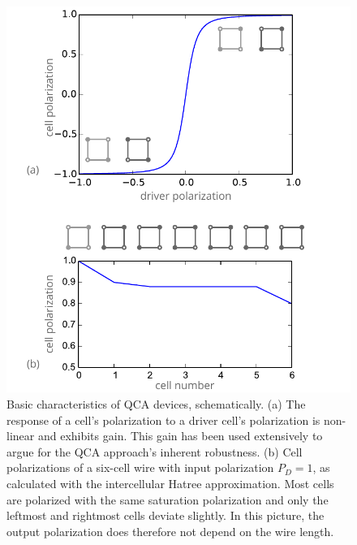 \begin{figure}
  \center
  \includegraphics{qca_characterization}
  \caption{
Basic characteristics of QCA devices, schematically. (a) The response of a
cell's polarization to a driver cell's polarization is non-linear and exhibits
gain. This gain has been used extensively to argue for the QCA approach's
inherent robustness. (b) Cell polarizations of a six-cell wire with input
polarization $P_D = 1$, as calculated with the intercellular Hatree
approximation. Most cells are polarized with the same saturation polarization
and only the leftmost and rightmost cells deviate slightly. In this picture, the
output polarization does therefore not depend on the wire length.
}
  \label{fig:qca_characterization}
\end{figure}


